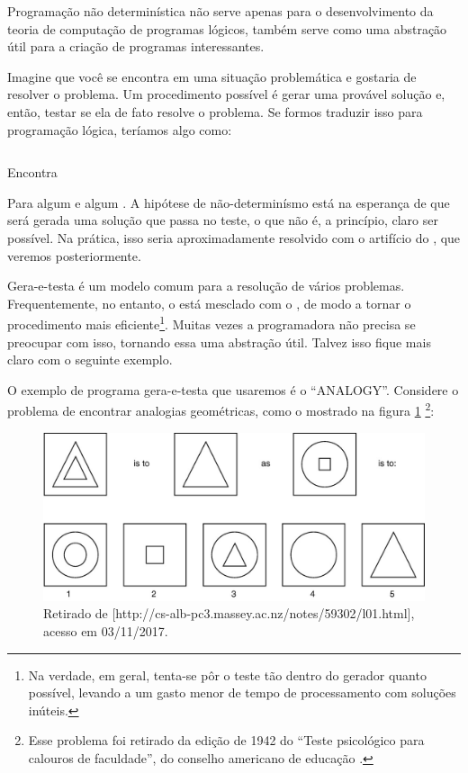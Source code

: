   Programação não determinística não serve apenas para o
  desenvolvimento da teoria de computação de programas lógicos, também
  serve como uma abstração útil para a criação de programas
  interessantes. 

  Imagine que você se encontra em uma situação problemática e gostaria
  de resolver o problema. Um procedimento possível é gerar uma
  provável solução e, então, testar se ela de fato resolve o
  problema. Se formos traduzir isso para programação lógica, teríamos
  algo como: 

    \begin{listing}
\inputminted{prolog}{../Exemplos/Cap1/prog2_encontra.pl}
\caption{Encontra}
    \end{listing}

Para algum  e algum . A hipótese de
não-determinísmo está na esperança de que será gerada uma solução que
passa no teste, o que não é, a princípio, claro ser possível. Na
prática, isso seria aproximadamente resolvido com o artifício do
, que veremos posteriormente. 

Gera-e-testa é um modelo comum para a resolução de vários
problemas. Frequentemente, no entanto, o  está
mesclado com o , de modo a tornar o procedimento mais
eficiente\footnote{Na verdade, em geral, tenta-se pôr o teste tão
  dentro do gerador quanto possível, levando a um gasto menor de tempo
  de processamento com soluções inúteis.}. Muitas vezes a programadora
não precisa se preocupar com isso, tornando essa uma abstração
útil. Talvez isso fique mais claro com o seguinte exemplo. 

O exemplo de programa gera-e-testa que usaremos é o
``ANALOGY''. Considere o problema de encontrar analogias geométricas,
como o mostrado na figura \ref{fig:psi} \footnote{Esse problema foi
  retirado da edição de 1942 do ``Teste psicológico para calouros de
  faculdade'', do conselho americano de educação \cite{evans}.}: 

\begin{figure}[h]
  \caption{Retirado de [http://cs-alb-pc3.massey.ac.nz/notes/59302/l01.html], acesso em 03/11/2017.}\label{fig:psi}
  \centering
  \includegraphics[width=\linewidth]{analogy}
\end{figure}

